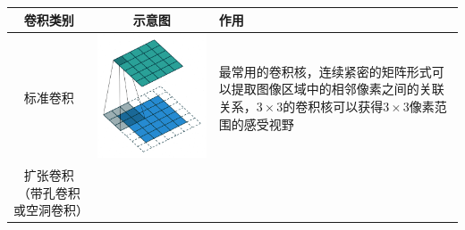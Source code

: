 \begin{longtable}[]{@{}ccl@{}}
\toprule
\begin{minipage}[b]{0.23\columnwidth}\centering\strut
卷积类别\strut
\end{minipage} & \begin{minipage}[b]{0.22\columnwidth}\centering\strut
示意图\strut
\end{minipage} & \begin{minipage}[b]{0.46\columnwidth}\raggedright\strut
作用\strut
\end{minipage}\tabularnewline
\midrule
\endhead
\begin{minipage}[t]{0.23\columnwidth}\centering\strut
标准卷积\strut
\end{minipage} & \begin{minipage}[t]{0.22\columnwidth}\centering\strut
\includegraphics{./img/ch5/img7.png}\strut
\end{minipage} & \begin{minipage}[t]{0.46\columnwidth}\raggedright\strut
最常用的卷积核，连续紧密的矩阵形式可以提取图像区域中的相邻像素之间的关联关系，\(3\times3\)的卷积核可以获得\(3\times3\)像素范围的感受视野\strut
\end{minipage}\tabularnewline
\begin{minipage}[t]{0.23\columnwidth}\centering\strut
扩张卷积（带孔卷积或空洞卷积）\strut
\end{minipage} & \begin{minipage}[t]{0.22\columnwidth}\centering\strut

\end{minipage}
\end{longtable}
